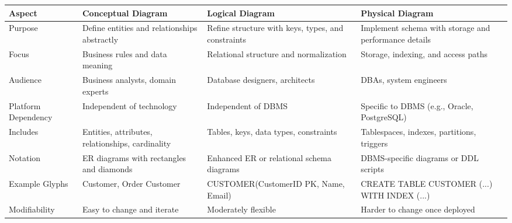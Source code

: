 \begin{NxLightListBox}[title={Conceptual, Logical, and Physical Diagrams}]
\end{NxLightListBox}

\begin{NxLightBox}[title={Schema Design Comparison}]
	\begin{tabularx}{\linewidth}{|l|X|X|X|}
		\hline
		\textbf{Aspect} & \textbf{Conceptual Diagram} & \textbf{Logical Diagram} & \textbf{Physical Diagram} \\
		\hline
		Purpose & Define entities and relationships abstractly & Refine structure with keys, types, and constraints & Implement schema with storage and performance details \\
		\hline
		Focus & Business rules and data meaning & Relational structure and normalization & Storage, indexing, and access paths \\
		\hline
		Audience & Business analysts, domain experts & Database designers, architects & DBAs, system engineers \\
		\hline
		Platform Dependency & Independent of technology & Independent of DBMS & Specific to DBMS (e.g., Oracle, PostgreSQL) \\
		\hline
		Includes & Entities, attributes, relationships, cardinality & Tables, keys, data types, constraints & Tablespaces, indexes, partitions, triggers \\
		\hline
		Notation & ER diagrams with rectangles and diamonds & Enhanced ER or relational schema diagrams & DBMS-specific diagrams or DDL scripts \\
		\hline
		Example Glyphs & Customer, Order Customer & CUSTOMER(CustomerID PK, Name, Email) & CREATE TABLE CUSTOMER (...) WITH INDEX (...) \\
		\hline
		Modifiability & Easy to change and iterate & Moderately flexible & Harder to change once deployed \\
		\hline
	\end{tabularx}
\end{NxLightBox}


